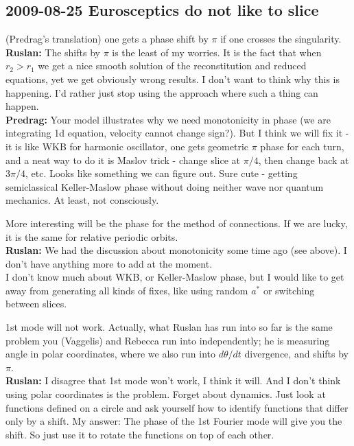 \documentclass[letter,10pt]{article}
\begin{document}
\subsection{2009-08-25 Eurosceptics do not like to slice}
 (Predrag's translation) one gets a phase shift by $\pi$ if one crosses the singularity.\\
{\bf Ruslan:} The shifts by $\pi$ is the least of my worries.  It is the fact that when $r_2 > r_1$ we get a nice smooth solution of the reconstitution and reduced equations, yet we get obviously wrong results.  I don't want to think why this is happening.  I'd rather just stop using the approach where such a thing can happen.\\
{\bf Predrag:} Your model illustrates why we need monotonicity in phase (we are integrating 1d equation, velocity cannot change sign?). But I think we will fix it - it is like WKB for harmonic oscillator, one gets geometric $\pi$ phase for each turn, and a neat way to do it is Maslov trick - change slice at $\pi/4$, then change back at $3\pi/4$, etc. Looks like something we can figure out. Sure cute - getting semiclassical Keller-Maslow phase without doing neither wave nor quantum mechanics. At least, not consciously.

More interesting will be the phase for the method of connections. If we are lucky, it is the same for relative periodic orbits.\\
{\bf Ruslan:} We had the discussion about monotonicity some time ago (see above).  I don't have anything more to add at the moment.\\
I don't know much about WKB, or Keller-Maslow phase, but I would like to get away from generating all kinds of fixes, like using random $a^*$ or switching between slices.

 1st mode will not work. Actually, what Ruslan has run into so far is the same problem you (Vaggelis) and Rebecca run into independently;
he is measuring angle in polar coordinates, where we also run into $d\theta/dt$ divergence, and shifts by $\pi$.\\
{\bf Ruslan:} I disagree that 1st mode won't work, I think it will. And I don't think using polar coordinates is the problem.  Forget about dynamics.  Just look at functions defined on a circle and ask yourself how to identify functions that differ only by a shift.  My answer: The phase of the 1st Fourier mode will give you the shift.  So just use it to rotate the functions on top of each other.
\end{document}
